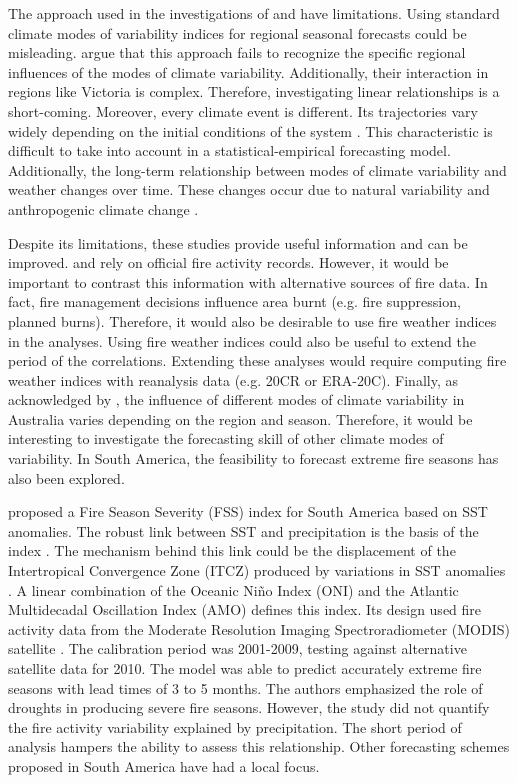 The approach used in the investigations of \citet{Nicholls2007} and
\citet{Harris2013} have limitations. Using standard climate modes
of variability indices for regional seasonal forecasts could be misleading.
\citet{Verdon-Kidd2008a} argue that this approach fails to recognize
the specific regional influences of the modes of climate variability.
Additionally, their interaction in regions like Victoria is complex.
Therefore, investigating linear relationships is a short-coming. Moreover,
every climate event is different. Its trajectories vary widely depending
on the initial conditions of the system \citep{VonStorch2001}. This
characteristic is difficult to take into account in a statistical-empirical
forecasting model. Additionally, the long-term relationship between
modes of climate variability and weather changes over time. These
changes occur due to natural variability and anthropogenic climate
change \citep{Wang2013,Power1999}. 

Despite its limitations, these studies provide useful information
and can be improved. \citet{Nicholls2007} and \citet{Harris2013}
rely on official fire activity records. However, it would be important
to contrast this information with alternative sources of fire data.
In fact, fire management decisions influence area burnt (e.g. fire
suppression, planned burns). Therefore, it would also be desirable
to use fire weather indices in the analyses. Using fire weather indices
could also be useful to extend the period of the correlations. Extending
these analyses would require computing fire weather indices with reanalysis
data (e.g. 20CR or ERA-20C). Finally, as acknowledged by \citet{Risbey2009b},
the influence of different modes of climate variability in Australia
varies depending on the region and season. Therefore, it would be
interesting to investigate the forecasting skill of other climate
modes of variability. In South America, the feasibility to forecast
extreme fire seasons has also been explored.

\citet*{Chen2011} proposed a Fire Season Severity (FSS) index for
South America based on SST anomalies. The robust link between SST
and precipitation is the basis of the index \citep*{Kousky1984,Ropelewski1987,Fernandes2011}.
The mechanism behind this link could be the displacement of the Intertropical
Convergence Zone (ITCZ) produced by variations in SST anomalies \citep{Zeng2008}.
A linear combination of the Oceanic Ni\~no Index (ONI) and the Atlantic
Multidecadal Oscillation Index (AMO) defines this index. Its design
used fire activity data from the Moderate Resolution Imaging Spectroradiometer
(MODIS) satellite \citep{Justice2002}. The calibration period was
2001-2009, testing against alternative satellite data for 2010. The
model was able to predict accurately extreme fire seasons with lead
times of 3 to 5 months. The authors emphasized the role of droughts
in producing severe fire seasons. However, the study did not quantify
the fire activity variability explained by precipitation. The short
period of analysis hampers the ability to assess this relationship.
Other forecasting schemes proposed in South America have had a local
focus.

